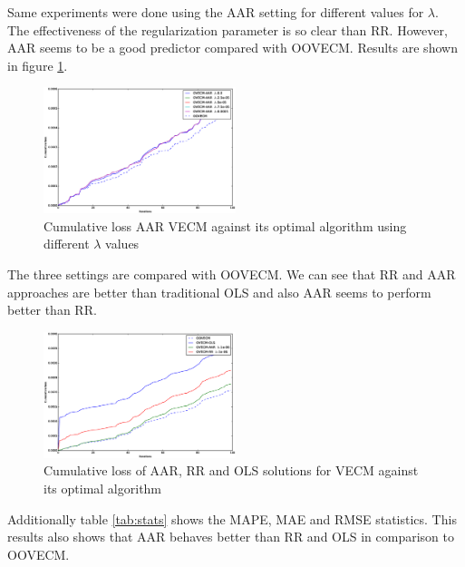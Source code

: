 \documentclass[twocolumn]{svjour3}          %
\begin{document}
Same experiments were done using the AAR setting for different values for $\lambda$. The effectiveness of the regularization parameter is so clear than RR. However, AAR seems to be a good predictor compared with OOVECM. Results are shown in figure \ref{fig:AARcomparison}.

\begin{figure}[!ht]
  \centering
  \includegraphics[width=0.5\textwidth]{AARcomparison}
  \caption{Cumulative loss AAR VECM against its optimal algorithm using different $\lambda$ values}
  \label{fig:AARcomparison}
\end{figure}

The three settings are compared with OOVECM. We can see that RR and AAR approaches are better than traditional OLS and also AAR seems to perform better than RR.

\begin{figure}[!ht]
  \centering
  \includegraphics[width=0.5\textwidth]{onlinecomparison}
  \caption{Cumulative loss of AAR, RR and OLS solutions for VECM against its optimal algorithm}
  \label{fig:onlinecomparison}
\end{figure}

Additionally table \ref{tab:stats} shows the MAPE, MAE and RMSE statistics. This results also shows that AAR behaves better than RR and OLS in comparison to OOVECM.
\end{document}
